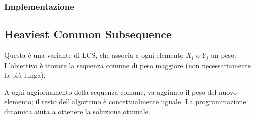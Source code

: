 \subsubsection{Implementazione}



\subsection{Heaviest Common Subsequence}
Questa è una variante di LCS, che associa a ogni elemento $X_i$ o $Y_j$ un peso. L'obiettivo è trovare la sequenza comune di peso maggiore (non necessariamente la più lunga).

A ogni aggiornamento della sequenza comune, va aggiunto il peso del nuovo elemento; il resto dell'algoritmo è concettualmente uguale. La programmazione dinamica aiuta a ottenere la soluzione ottimale.




